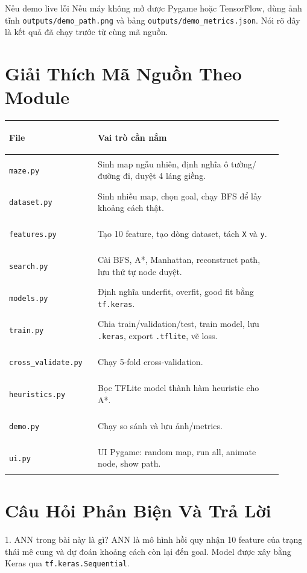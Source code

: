 \documentclass[12pt,a4paper]{article}
\newcommand{\code}[1]{\texttt{#1}}
\begin{document}
\begin{warnbox}{Nếu demo live lỗi}
Nếu máy không mở được Pygame hoặc TensorFlow, dùng ảnh tĩnh \code{outputs/demo\_path.png} và bảng \code{outputs/demo\_metrics.json}. Nói rõ đây là kết quả đã chạy trước từ cùng mã nguồn.
\end{warnbox}

\section{Giải Thích Mã Nguồn Theo Module}

\begin{small}
\begin{longtable}{>{\bfseries\raggedright\arraybackslash}p{0.28\linewidth}p{0.62\linewidth}}
\toprule
File & Vai trò cần nắm \\
\midrule
\code{maze.py} & Sinh map ngẫu nhiên, định nghĩa ô tường/đường đi, duyệt 4 láng giềng. \\
\code{dataset.py} & Sinh nhiều map, chọn goal, chạy BFS để lấy khoảng cách thật. \\
\code{features.py} & Tạo 10 feature, tạo dòng dataset, tách \code{X} và \code{y}. \\
\code{search.py} & Cài BFS, A*, Manhattan, reconstruct path, lưu thứ tự node duyệt. \\
\code{models.py} & Định nghĩa underfit, overfit, good fit bằng \code{tf.keras}. \\
\code{train.py} & Chia train/validation/test, train model, lưu \code{.keras}, export \code{.tflite}, vẽ loss. \\
\code{cross\_validate.py} & Chạy 5-fold cross-validation. \\
\code{heuristics.py} & Bọc TFLite model thành hàm heuristic cho A*. \\
\code{demo.py} & Chạy so sánh và lưu ảnh/metrics. \\
\code{ui.py} & UI Pygame: random map, run all, animate node, show path. \\
\bottomrule
\end{longtable}
\end{small}

\section{Câu Hỏi Phản Biện Và Trả Lời}

\begin{teachbox}{1. ANN trong bài này là gì?}
ANN là mô hình hồi quy nhận 10 feature của trạng thái mê cung và dự đoán khoảng cách còn lại đến goal. Model được xây bằng Keras qua \code{tf.keras.Sequential}.
\end{teachbox}
\end{document}
